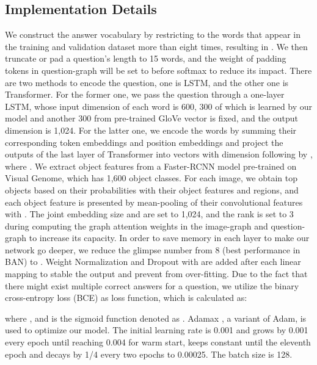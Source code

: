 \documentclass[10pt,twocolumn,letterpaper]{article}
\begin{document}
\subsection{Implementation Details}
We construct the answer vocabulary by restricting to the words that appear in the training and validation dataset more than eight times, resulting in . We then truncate or pad a question's length  to 15 words, and the weight of padding tokens in question-graph  will be set to  before softmax to reduce its impact. There are two methods to encode the question, one is LSTM, and the other one is Transformer. For the former one, we pass the question through a one-layer LSTM, whose input dimension of each word is 600, 300 of which is learned by our model and another 300 from pre-trained GloVe vector \cite{pennington2014glove} is fixed, and the output dimension  is 1,024. For the latter one, we encode the words by summing their corresponding token embeddings and position embeddings and project the outputs of the last layer of Transformer into vectors with dimension  following by , where . We extract object features from a Faster-RCNN model \cite{anderson2018bottom} pre-trained on Visual Genome, which has 1,600 object classes. For each image, we obtain top  objects based on their probabilities with their object features and regions, and each object feature is presented by mean-pooling of their convolutional features with . The joint embedding size  and  are set to 1,024, and the rank  is set to 3 during computing the graph attention weights in the image-graph and question-graph to increase its capacity. In order to save memory in each layer to make our network go deeper, we reduce the glimpse number from 8 (best performance in BAN) to . Weight Normalization \cite{salimans2016weight} and Dropout \cite{srivastava2014dropout} with  are added after each linear mapping to stable the output and prevent from over-fitting. Due to the fact that there might exist multiple correct answers for a question, we utilize the binary cross-entropy loss (BCE) as loss function, which is calculated as:
\vspace{-5pt}

where , and  is the sigmoid function denoted as . Adamax \cite{kingma2014adam}, a variant of Adam, is used to optimize our model. The initial learning rate is 0.001 and grows by 0.001 every epoch until reaching 0.004 for warm start, keeps constant until the eleventh epoch and decays by 1/4 every two epochs to 0.00025. The batch size is 128. 
\end{document}
